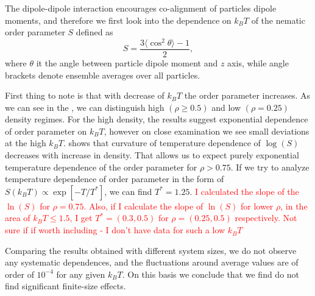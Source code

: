 The dipole-dipole interaction encourages co-alignment of particles dipole moments, and therefore we first look into the dependence on $k_BT$ of the nematic order parameter $S$ defined as
\begin{equation}
\label{eq:nematic_order_parameter}
	S = \frac{3 \langle\cos^2 \theta\rangle - 1}{2}
	,
\end{equation}
where $\theta$ it the angle between particle dipole moment and $z$ axis, while angle brackets denote ensemble averages over all particles.

First thing to note is that with decrease of $k_BT$ the order parameter increases. As we can see in the , we can distinguish high $(\rho \geq 0.5)$ and low $(\rho = 0.25)$ density regimes. For the high density, the results suggest exponential dependence of order parameter on $k_BT$, however on close examination we see small deviations at the high $k_BT$.  shows that curvature of temperature dependence of $\log(S)$ decreases with increase in density. That allows us to expect purely exponential temperature dependence of the order parameter for $\rho > 0.75$. If we try to analyze temperature dependence of order parameter in the form of $S(k_BT) \propto \exp\left[-T/T^* \right]$, we can find $T^* = 1.25$. \textcolor{red}{I calculated the slope of the $\ln(S)$ for $\rho = 0.75$. Also, if I calculate the slope of $\ln(S)$ for lower $\rho$, in the area of $k_BT \leq 1.5$, I get $T^* = (0.3, 0.5)$ for $\rho = (0.25, 0.5)$ respectively. Not sure if if worth including - I don't have data for such a low $k_BT$}

Comparing the results obtained with different system sizes, we do not observe any systematic dependences, and the fluctuations around average values are of order of $10^{-4}$ for any given $k_BT$. On this basis we conclude that we find do not find significant finite-size effects.

